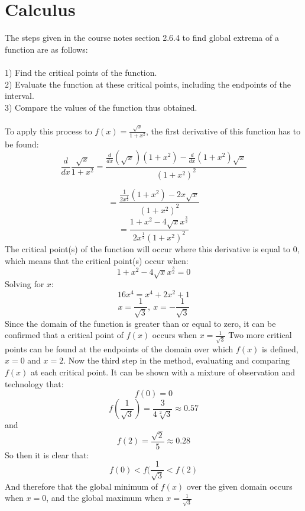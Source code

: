 \documentclass[11pt]{article}
\begin{document}
\section*{Calculus}
The steps given in the course notes section 2.6.4 to find global extrema of a function are as follows:\\\\
1) Find the critical points of the function.\\
2) Evaluate the function at these critical points, including the endpoints of the interval.\\
3) Compare the values of the function thus obtained.\\
\\
To apply this process to $f(x)=\frac{\sqrt{x}}{1+x^2}$, the first derivative of this function has to be found:
$$\frac{d}{dx}\frac{\sqrt{x}}{1+x^2} =\frac{\frac{d}{dx}\left(\sqrt{x}\right)\left(1+x^2\right)-\frac{d}{dx}\left(1+x^2\right)\sqrt{x}}{\left(1+x^2\right)^2}$$

$$=\frac{\frac{1}{2x^{\frac{1}{2}}}\left(1+x^2\right)-2x\sqrt{x}}{\left(1+x^2\right)^2}$$
$$=\frac{1+x^2-4\sqrt{x}x^{\frac{3}{2}}}{2x^{\frac{1}{2}}\left(1+x^2\right)^2}$$
The critical point(s) of the function will occur where this derivative is equal to 0, which means that the critical point(s) occur when:
$$1+x^2-4\sqrt{x}x^{\frac{3}{2}}=0$$
Solving for $x$:
$$16x^4=x^4+2x^2+1$$
$$x=\frac{1}{\sqrt{3}},\:x=-\frac{1}{\sqrt{3}}$$
Since the domain of the function is greater than or equal to zero, it can be confirmed that a critical point of $f(x)$ occurs when $x=\frac{1}{\sqrt{3}}$
Two more critical points can be found at the endpoints of the domain over which $f(x)$ is defined, $x=0$ and $x=2$. Now the third step in the method, evaluating and comparing $f(x)$ at each critical point. It can be shown with a mixture of observation and technology that:
$$f(0)=0$$
$$f(\frac{1}{\sqrt{3}})=\frac{3}{4\sqrt[2]{3}}\approx 0.57$$
and
$$f(2)=\frac{\sqrt{2}}{5}\approx 0.28$$
So then it is clear that:
$$f(0)<f(\frac{1}{\sqrt{3}}<f(2)$$
And therefore that the global minimum of $f(x)$ over the given domain occurs when $x=0$, and the global maximum when $x=\frac{1}{\sqrt{3}}$
\end{document}
